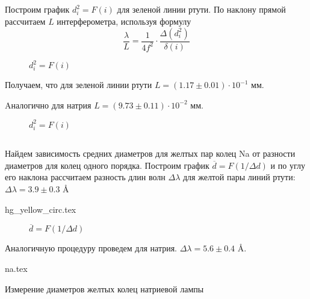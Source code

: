 \subsection{}
Построим график $d^2_i = F(i)$ для зеленой линии ртути. По наклону прямой
рассчитаем $L$ интерферометра, используя формулу
$$
\frac{\lambda}{L} = \frac{1}{4f^2} \cdot \frac{\Delta (d^2_i)}{\delta (i)}
$$

\begin{figure}[h!]
  \caption{$d^2_i = F(i)$}
  \label{img::di_hg}
\end{figure}

Получаем, что для зеленой линии ртути $L = (1.17 \pm 0.01) \cdot 10^{-1}$ мм.

Aналогично для натрия $L = (9.73 \pm 0.11) \cdot 10^{-2}$ мм.

\newpage

\begin{figure}[h!]
  \caption{$d^2_i = F(i)$}
  \label{img::di_na}
\end{figure}

\newpage
\subsection{}

Найдем зависимость средних диаметров для желтых пар колец Na от разности диаметров
для колец одного порядка. Построим график $\overline{d} = F(1/\Delta d)$ и по
углу его наклона рассчитаем разность длин волн $\Delta \lambda$ для желтой пары
линий ртути: $\Delta \lambda = 3.9 \pm 0.3$ \AA

{hg_yellow_circ.tex}

\begin{figure}[h!]
  \caption{$\overline{d} = F(1/\Delta d)$}
  \label{img::avg_diam_hg}
\end{figure}

\newpage

Аналогичную процедуру проведем для натрия. $\Delta \lambda = 5.6 \pm 0.4$ \AA.

\begin{table}[h!]
  \begin{center}
    {na.tex}
  \end{center}
  \caption{Измерение диаметров желтых колец натриевой лампы}
\end{table}

